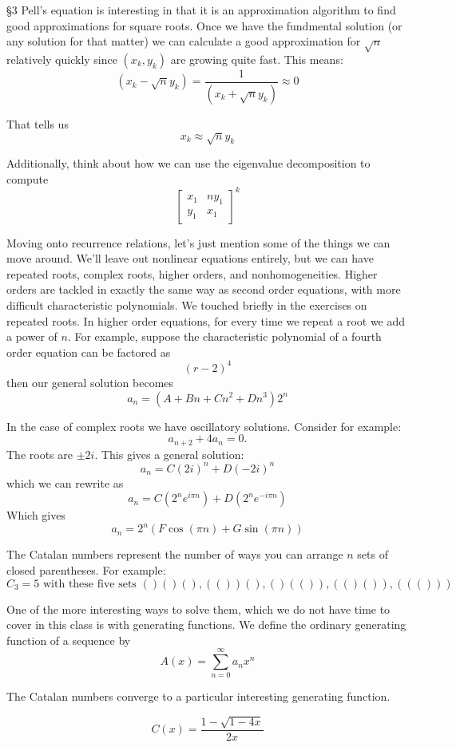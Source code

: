 \documentclass[16 pt]{amsart}
\theoremstyle{definition}
\theoremstyle{remark}
\numberwithin{equation}{subsection}
\begin{document}
\S3
Pell's equation is interesting in that it is an approximation algorithm to find good approximations for square roots.  Once we have the fundmental solution (or any solution for that matter) we can calculate a good approximation for $\sqrt{n}$ relatively quickly since $(x_k,y_k)$ are growing quite fast.  This means:
\[
(x_k - \sqrt{n}y_k) = \frac{1}{(x_k+\sqrt{n}y_k)} \approx 0
\]

That tells us
\[
x_k \approx \sqrt{n} y_k
\]

Additionally, think about how we can use the eigenvalue decomposition to compute
\[
\begin{bmatrix}
x_1 & ny_1\\
y_1 & x_1
\end{bmatrix}^k
\]


\par Moving onto recurrence relations, let's just mention some of the things we can move around.  We'll leave out nonlinear equations entirely, but we can have repeated roots, complex roots, higher orders, and nonhomogeneities.  Higher orders are tackled in exactly the same way as second order equations, with more difficult characteristic polynomials.  We touched briefly in the exercises on repeated roots.  In higher order equations, for every time we repeat a root we add a power of $n$.  For example, suppose the characteristic polynomial of a fourth order equation can be factored as
\[
(r-2)^4
\]
then our general solution becomes
\[
a_n = (A+Bn+Cn^2+Dn^3)2^n
\]

In the case of complex roots we have oscillatory solutions.  Consider for example:
\[
a_{n+2}+4a_n = 0.
\]
The roots are $\pm 2i$.
This gives a general solution:
\[
a_n = C(2i)^n + D(-2i)^n
\]
which we can rewrite as
\[
a_n = C(2^n e^{i\pi n})+ D(2^ne^{-i\pi n})
\]
Which gives
\[
a_n = 2^n(F\cos(\pi n)+ G \sin(\pi n))
\]

The Catalan numbers represent the number of ways you can arrange $n$ sets of closed parentheses. For example:
\[
C_3 = 5 \text{ with these five sets } ()()(),(())(),()(()),(()()),((()))
\]

One of the more interesting ways to solve them, which we do not have time to cover in this class is with generating functions.  We define the ordinary generating function of a sequence by
\[
A(x) = \sum_{n=0}^{\infty} a_n x^n
\]

The Catalan numbers converge to a particular interesting generating function.

\[
C(x) = \frac{1-\sqrt{1-4x}}{2x}
\]
\end{document}
